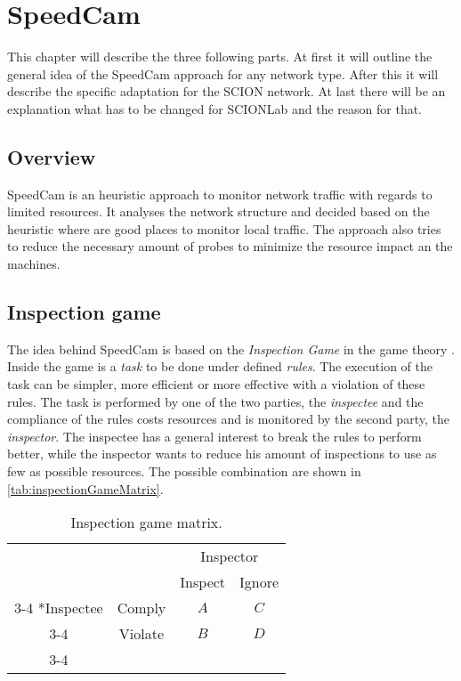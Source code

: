 \documentclass[thesis.tex]{subfiles}
\begin{document}
\chapter{SpeedCam}\label{chap:main}

This chapter will describe the three following parts. At first it will outline the general idea of the SpeedCam approach for any network type. After this it will describe the specific adaptation for the SCION network. At last there will be an explanation what has to be changed for SCIONLab and the reason for that.

\section{Overview}
SpeedCam is an heuristic approach to monitor network traffic with regards to limited resources. It analyses the network structure and decided based on the heuristic where are good places to monitor local traffic. The approach also tries to reduce the necessary amount of probes to minimize the resource impact an the machines.


\section{Inspection game}
The idea behind SpeedCam is based on the \textit{Inspection Game} in the game theory . Inside the game is a \textit{task} to be done under defined \textit{rules}. The execution of the task can be simpler, more efficient or more effective with a violation of these rules. The task is performed by one of the two parties, the \textit{inspectee} and the compliance of the rules costs resources and is monitored by the second party, the \textit{inspector}. The inspectee has a general interest to break the rules to perform better, while the inspector wants to reduce his amount of inspections to use as few as possible resources. The possible combination are shown in \autoref{tab:inspectionGameMatrix}.

\begin{table}[h]
    \centering
    \begin{tabular}{cc|c|c|}
        & \multicolumn{1}{c}{} & \multicolumn{2}{c}{Inspector}\\
        & \multicolumn{1}{c}{} & \multicolumn{1}{c}{Inspect}  & \multicolumn{1}{c}{Ignore} \\\cline{3-4}
        \multirow{2}*{Inspectee}  & Comply & $A$ & $C$ \\\cline{3-4}
        & Violate & $B$ & $D$ \\\cline{3-4}
    \end{tabular}
    \caption{Inspection game matrix.}
    \label{tab:inspectionGameMatrix}
\end{table}
\end{document}
